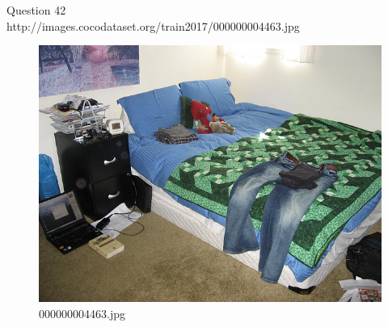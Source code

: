 Question 42\\
http://images.cocodataset.org/train2017/000000004463.jpg
\begin{figure}[h]
    \centering
    \includegraphics[width=0.8\linewidth]{../image set/hard/000000004463.jpg}
    \caption{000000004463.jpg}
\end{figure}
